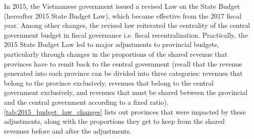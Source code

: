 \documentclass[12pt]{article}
\newcommand{\1}{\mathbbm{1}}
\begin{document}
In 2015, the Vietnamese government issued a revised Law on the State Budget (hereafter 2015 State Budget Law), which became effective from the 2017 fiscal year. Among other changes, the revised law reiterated the centrality of the central government budget in fiscal governance i.e. fiscal recentralization. Practically, the 2015 State Budget Law led to major adjustments to provincial budgets, particularly through changes in the proportions of the shared revenue that provinces have to remit back to the central government (recall that the revenue generated into each province can be divided into three categories: revenues that belong to the province exclusively, revenues that belong to the central government exclusively, and revenues that must be shared between the provincial and the central government according to a fixed ratio). \autoref{tab:2015_budget_law_changes} lists out provinces that were impacted by these adjustments, along with the proportions they get to keep from the shared revenues before and after the adjustments.
\end{document}
